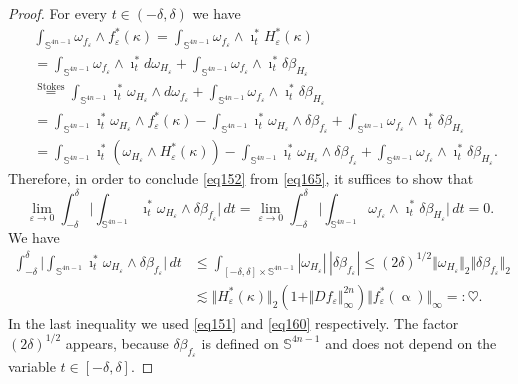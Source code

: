 \documentclass[intlimits,12pt,reqno]{amsart}
\newcommand{\Sph}{\mathbb S}
\newcommand{\eps}{\varepsilon}
\numberwithin{equation}{section}
\theoremstyle{definition}
\newcommand{\brac}[1]{\left ( #1 \right )}
\begin{document}
\begin{proof}
For every $t \in (-\delta,\delta)$ we have
\[
\begin{split}
&
\int_{\Sph^{4n-1}} \omega_{f_\eps} \wedge f_{\eps}^\ast(\kappa)
= 
\int_{\Sph^{4n-1}} \omega_{f_\eps} \wedge \imath_t^\ast H_\eps^\ast(\kappa)\\
&= 
\int_{\Sph^{4n-1}} \omega_{f_\eps} \wedge \imath_t^\ast d\omega_{H_\eps} + \int_{\Sph^{4n-1}} \omega_{f_\eps} \wedge \imath_t^\ast \delta \beta_{H_\eps}\\
&\overset{\text{Stokes}}{=} 
\int_{\Sph^{4n-1}} \imath_t^\ast \omega_{H_\eps} \wedge d\omega_{f_\eps} + \int_{\Sph^{4n-1}} \omega_{f_\eps} \wedge \imath_t^\ast \delta \beta_{H_\eps}\\
&= 
\int_{\Sph^{4n-1}} \imath_t^\ast \omega_{H_\eps} \wedge f_\eps^\ast(\kappa) 
-\int_{\Sph^{4n-1}} \imath_t^\ast \omega_{H_\eps} \wedge \delta \beta_{f_\eps}
+ \int_{\Sph^{4n-1}} \omega_{f_\eps} \wedge \imath_t^\ast \delta \beta_{H_\eps}\\
&= 
\int_{\Sph^{4n-1}} \imath_t^\ast \brac{\omega_{H_\eps} \wedge H_\eps^\ast(\kappa)} 
-\int_{\Sph^{4n-1}} \imath_t^\ast \omega_{H_\eps} \wedge \delta \beta_{f_\eps}
+ \int_{\Sph^{4n-1}} \omega_{f_\eps} \wedge \imath_t^\ast \delta \beta_{H_\eps}.
\end{split}
\]
Therefore, in order to conclude \eqref{eq152} from \eqref{eq165}, it suffices to show that
\begin{equation} 
\label{eq149}
\lim_{\eps\to 0}\int_{-\delta}^\delta 
\Bigg|\int_{\Sph^{4n-1}} \imath_{t}^\ast \omega_{H_\eps} \wedge \delta \beta_{f_\eps}\Bigg|\, dt
=
\lim_{\eps\to 0}\int_{-\delta}^\delta 
\Bigg|\int_{\Sph^{4n-1}} \omega_{f_\eps} \wedge \imath_{t}^\ast \delta \beta_{H_\eps}\Bigg|\, dt = 0.
\end{equation}
We have
\[
\begin{split}
\int_{-\delta}^\delta 
\Bigg|\int_{\Sph^{4n-1}} \imath_{t}^\ast \omega_{H_\eps} \wedge \delta \beta_{f_\eps}\Bigg|\, dt
&\leq
\int_{[-\delta,\delta]\times\Sph^{4n-1}} |\omega_{H_\eps}|\, |\delta\beta_{f_\eps}|
\leq (2\delta)^{1/2}\Vert\omega_{H_\eps}\Vert_2\Vert\delta\beta_{f_\eps}\Vert_2\\
&\lesssim
\Vert H_\eps^*(\kappa)\Vert_2(1+\Vert Df_\eps\Vert_\infty^{2n})\Vert f_\eps^*(\upalpha)\Vert_\infty =:\heartsuit.
\end{split}
\]
In the last inequality we used \eqref{eq151} and  \eqref{eq160} respectively. The factor $(2\delta)^{1/2}$ appears, because $\delta\beta_{f_\eps}$ is defined on $\Sph^{4n-1}$ and does not depend on the variable $t\in[-\delta,\delta]$.



\end{proof}
\end{document}

